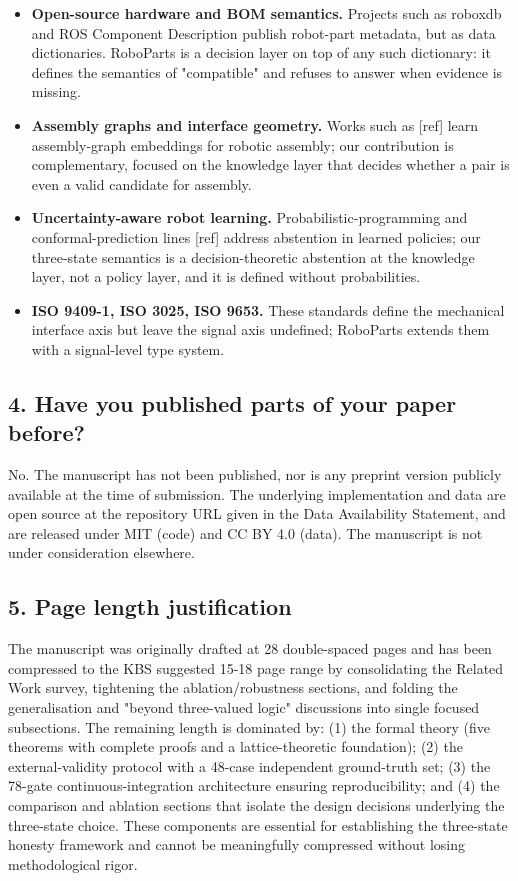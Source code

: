 \documentclass[11pt]{article}
\begin{document}
\begin{itemize}[leftmargin=*]
    \item \textbf{Open-source hardware and BOM semantics.} Projects such as roboxdb and ROS Component Description publish robot-part metadata, but as data dictionaries. RoboParts is a decision layer on top of any such dictionary: it defines the semantics of "compatible" and refuses to answer when evidence is missing.
    
    \item \textbf{Assembly graphs and interface geometry.} Works such as [ref] learn assembly-graph embeddings for robotic assembly; our contribution is complementary, focused on the knowledge layer that decides whether a pair is even a valid candidate for assembly.
    
    \item \textbf{Uncertainty-aware robot learning.} Probabilistic-programming and conformal-prediction lines [ref] address abstention in learned policies; our three-state semantics is a decision-theoretic abstention at the knowledge layer, not a policy layer, and it is defined without probabilities.
    
    \item \textbf{ISO 9409-1, ISO 3025, ISO 9653.} These standards define the mechanical interface axis but leave the signal axis undefined; RoboParts extends them with a signal-level type system.
\end{itemize}

\subsection*{4. Have you published parts of your paper before?}

\noindent No. The manuscript has not been published, nor is any preprint version publicly available at the time of submission. The underlying implementation and data are open source at the repository URL given in the Data Availability Statement, and are released under MIT (code) and CC BY 4.0 (data). The manuscript is not under consideration elsewhere.

\subsection*{5. Page length justification}

\noindent The manuscript was originally drafted at 28 double-spaced pages and has been compressed to the KBS suggested 15-18 page range by consolidating the Related Work survey, tightening the ablation/robustness sections, and folding the generalisation and "beyond three-valued logic" discussions into single focused subsections. The remaining length is dominated by: (1) the formal theory (five theorems with complete proofs and a lattice-theoretic foundation); (2) the external-validity protocol with a 48-case independent ground-truth set; (3) the 78-gate continuous-integration architecture ensuring reproducibility; and (4) the comparison and ablation sections that isolate the design decisions underlying the three-state choice. These components are essential for establishing the three-state honesty framework and cannot be meaningfully compressed without losing methodological rigor.
\end{document}
